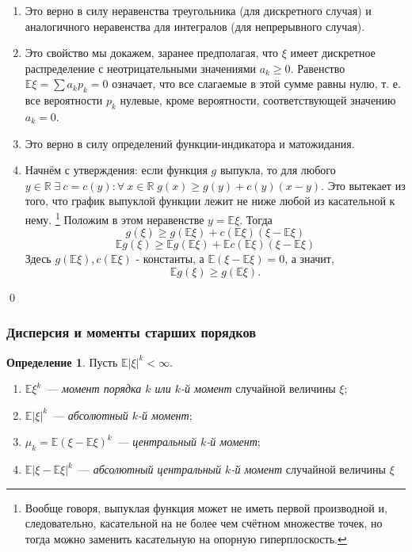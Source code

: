 \documentclass[oneside,final,14pt]{extreport}
\renewenvironment{proof}{{\bfseries Доказательство.}}{\qed}
\theoremstyle{plain}
\theoremstyle{definition}
\newtheorem*{defn}{Определение}
\theoremstyle{named}
\begin{document}
\begin{proof}
\begin{enumerate}
    \item Это верно в силу неравенства треугольника (для дискретного случая) и аналогичного неравенства для интегралов (для непрерывного случая).
    
    \item Это свойство мы докажем, заранее предполагая, что $\xi$ имеет дискретное распределение с неотрицательными значениями $a_k \geqslant 0$. Равенство $\mathbb{E}\xi = \sum a_k p_k = 0$ означает, что все слагаемые в этой сумме равны нулю, т. е. все вероятности $p_k$ нулевые, кроме вероятности, соответствующей значению $a_k = 0$.
    
    \item Это верно в силу определений функции-индикатора и матожидания.
    
    \item Начнём с утверждения: если функция $g$ выпукла, то для любого ${y \in \mathbb{R}} \; {\exists \: c = c(y) \colon} \forall \: x \in \mathbb{R} \; g(x) \geqslant g(y) + c(y)(x - y)$. Это вытекает из того, что график выпуклой функции лежит не ниже любой из касательной к нему. \footnote{Вообще говоря, выпуклая функция может не иметь первой производной и, следовательно, касательной на не более чем счётном множестве точек, но тогда можно заменить касательную на опорную гиперплоскость.} Положим в этом неравенстве $y = \mathbb{E}\xi$. Тогда
    $$ g(\xi) \geqslant g(\mathbb{E}\xi) + c(\mathbb{E}\xi)(\xi - \mathbb{E}\xi) $$
    $$ \mathbb{E}g(\xi) \geqslant \mathbb{E}g(\mathbb{E}\xi) +  \mathbb{E}c(\mathbb{E}\xi)(\xi - \mathbb{E}\xi)$$
    Здесь $g(\mathbb{E}\xi), c(\mathbb{E}\xi)$ - константы, а $\mathbb{E}(\xi - \mathbb{E}\xi) = 0$, а значит,
    $$ \mathbb{E}g(\xi) \geqslant g(\mathbb{E}\xi).$$
\end{enumerate}
\end{proof}

\subsubsection{Дисперсия и моменты старших порядков}

\begin{defn}
    Пусть ${\mathbb{E}|\xi|^k < \infty}$. 
    \begin{enumerate}
        \item ${\mathbb{E}\xi^k}$~--- {\it момент порядка $k$ или $k$-й момент} случайной величины $\xi$;
        \item ${\mathbb{E}|\xi|^k}$~--- {\it абсолютный $k$-й момент};
        \item $\mu_k = {\mathbb{E}(\xi - \mathbb{E}\xi)^k}$~--- {\it центральный $k$-й момент};
        \item ${\mathbb{E}|\xi - \mathbb{E}\xi|^k}$~--- {\it абсолютный центральный $k$-й момент} случайной величины $\xi$
    \end{enumerate}
\end{defn}
\end{document}
